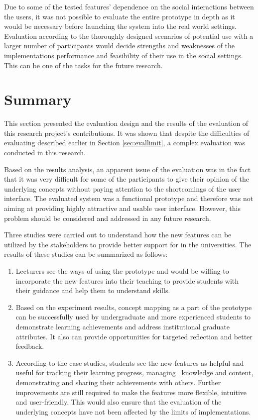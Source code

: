 Due to some of the tested features' dependence on the social interactions
between the users, it was not possible to evaluate the entire prototype in depth
as it would be necessary before launching the system into the real world
settings. Evaluation according to the thoroughly designed scenarios of potential
use with a larger number of participants would decide strengths and weaknesses
of the implementations performance and feasibility of their use in the social
settings. This can be one of the tasks for the future research.

\section{Summary}

This section presented the evaluation design and the results of the evaluation
of this research project's contributions. It was shown that despite the
difficulties of evaluating \LLLs described earlier in Section
\ref{sec:evallimit}, a complex evaluation was conducted in this research.

Based on the results analysis, an apparent issue of the evaluation was in the
fact that it was very difficult for some of the participants to give their
opinion of the underlying concepts without paying attention to the shortcomings
of the user interface. The evaluated system was a functional prototype and
therefore was not aiming at providing highly attractive and usable user
interface. However, this problem should be considered and addressed in any
future research.

Three studies were carried out to understand how the new features can be
utilized by the stakeholders to provide better support for \LLLs in the
universities. The results of these studies can be summarized as follows:

\begin{enumerate}
  \item Lecturers see the ways of using the prototype and would be willing
  to incorporate the new features into their teaching to provide students with
  their guidance and help them to understand \LLLs skills.
  \item Based on the experiment results, concept mapping as a part of the
  prototype can be successfully used by undergraduate and more experienced
  students to demonstrate learning achievements and address institutional
  graduate attributes. It also can provide opportunities for targeted reflection
  and better feedback.
  \item According to the case studies, students see the new features as
  helpful and useful for tracking their learning progress, managing
  \ep~knowledge and content, demonstrating and sharing their achievements with
  others. Further improvements are still required to make the features more
  flexible, intuitive and user-friendly. This would also ensure that the
  evaluation of the underlying concepts have not been affected by the limits of
  implementations.
\end{enumerate} 


